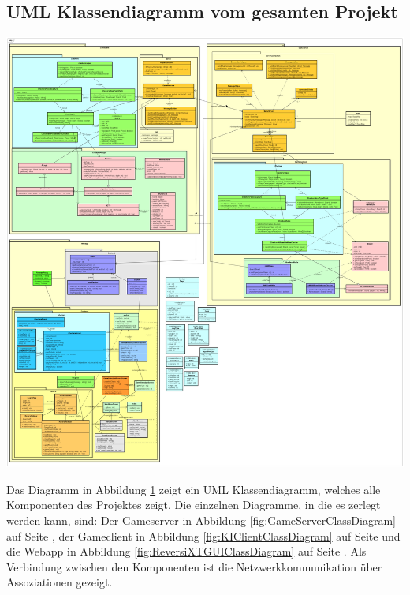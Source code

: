 \documentclass[12pt,a4paper,bibliography=totocnumbered,listof=totocnumbered]{article}
\begin{document}
\begin{appendix}
\section{\ac{UML} Klassendiagramm vom gesamten Projekt}
\label{apx:AllClassDiagrams}
\vspace{1em}
\begin{minipage}{\linewidth}
	\centering
	\includegraphics[width=1.0\linewidth]{pics/AllClassDiagrams.png}
\end{minipage}

Das Diagramm in Abbildung \ref{apx:AllClassDiagrams} zeigt ein \ac{UML} Klassendiagramm, welches alle Komponenten des Projektes zeigt.
Die einzelnen Diagramme, in die es zerlegt werden kann, sind: Der Gameserver in Abbildung \ref{fig:GameServerClassDiagram} auf Seite \pageref{fig:GameServerClassDiagram},
der Gameclient in Abbildung \ref{fig:KIClientClassDiagram} auf Seite \pageref{fig:KIClientClassDiagram} und die Webapp in Abbildung \ref{fig:ReversiXTGUIClassDiagram}
auf Seite \pageref{fig:ReversiXTGUIClassDiagram}. Als Verbindung zwischen den Komponenten ist die Netzwerkkommunikation über Assoziationen gezeigt. 

\pagebreak


\end{appendix}
\end{document}
